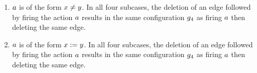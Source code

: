 \begin{enumerate}
\begin{enumerate}
\item $a$ is of the form $x\neq y$.
In all four subcases, the deletion of an edge followed by 
firing the action $a$ results in the same configuration
$g_4$ as firing $a$ then deleting the same edge.
\item $a$ is of the form $x:=y$.
%
In all four subcases, the deletion of an edge followed by 
firing the action $a$ results in the same configuration
$g_4$ as firing $a$ then deleting the same edge.

\end{enumerate}
\end{enumerate}
